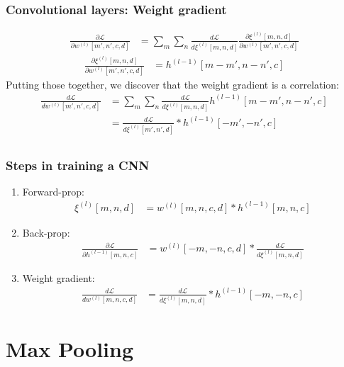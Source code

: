 \documentclass{beamer}
\begin{document}
\begin{frame}
  \frametitle{Convolutional layers: Weight gradient}

  \begin{align*}
    \frac{\partial{\mathcal L}}{\partial w^{(l)}[m',n',c,d]} &=
    \sum_{m}\sum_n\frac{d{\mathcal L}}{d\xi^{(l)}[m,n,d]}
    \frac{\partial\xi^{(l)}[m,n,d]}{\partial w^{(l)}[m',n',c,d]}
  \end{align*}
  \begin{align*}
    \frac{\partial\xi^{(l)}[m,n,d]}{\partial w^{(l)}[m',n',c,d]} &= h^{(l-1)}[m-m',n-n',c]
  \end{align*}
  Putting those together, we discover that the weight gradient is a correlation:
  \begin{align*}
    \frac{d{\mathcal L}}{dw^{(l)}[m',n',c,d]} &=
    \sum_{m}\sum_n \frac{d{\mathcal L}}{d\xi^{(l)}[m,n,d]}h^{(l-1)}[m-m',n-n',c]\\
    &= \frac{d{\mathcal L}}{d\xi^{(l)}[m',n',d]} \ast h^{(l-1)}[-m',-n',c]\\
  \end{align*}
\end{frame}

\begin{frame}
  \frametitle{Steps in training a CNN}
  \begin{enumerate}
  \item Forward-prop:
    \begin{align*}
      \xi^{(l)}[m,n,d] &= w^{(l)}[m,n,c,d] \ast h^{(l-1)}[m,n,c]
    \end{align*}
  \item Back-prop:
    \begin{align*}
      \frac{\partial{\mathcal L}}{\partial h^{(l-1)}[m,n,c]} &=
      w^{(l)}[-m,-n,c,d] \ast \frac{d{\mathcal L}}{d\xi^{(l)}[m,n,d]}
    \end{align*}
  \item Weight gradient:
    \begin{align*}
      \frac{d{\mathcal L}}{dw^{(l)}[m,n,c,d]} &=
      \frac{d{\mathcal L}}{d\xi^{(l)}[m,n,d]} \ast h^{(l-1)}[-m,-n,c]
    \end{align*}
  \end{enumerate}
\end{frame}

\section{Max Pooling}
\setcounter{subsection}{1}
\end{document}
